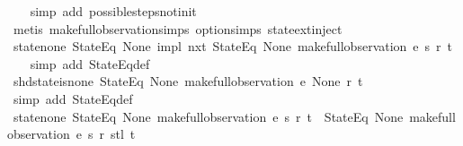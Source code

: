 \begin{isabellebody}
\ \ \isamarkupfalse%
\ {\isacharparenleft}simp\ add{\isacharcolon}\ possible{\isacharunderscore}steps{\isacharunderscore}not{\isacharunderscore}init{\isacharparenright}\isanewline
\ \ \isamarkupfalse%
\ {\isacharparenleft}metis\ make{\isacharunderscore}full{\isacharunderscore}observation{\isachardot}simps{\isacharparenleft}{}{\isacharparenright}\ option{\isachardot}simps{\isacharparenleft}{}{\isacharparenright}\ state{\isachardot}ext{\isacharunderscore}inject{\isacharparenright}%
\endisatagproof
{\isafoldproof}%
%
\isadelimproof
\isanewline
%
\endisadelimproof
\isanewline
{}\isamarkupfalse%
\ state{\isacharunderscore}none{\isacharcolon}\ {\isachardoublequoteopen}{\isacharparenleft}{\isacharparenleft}StateEq\ None{\isacharparenright}\ impl\ nxt\ {\isacharparenleft}StateEq\ None{\isacharparenright}{\isacharparenright}\ {\isacharparenleft}make{\isacharunderscore}full{\isacharunderscore}observation\ e\ s\ r\ t{\isacharparenright}{\isachardoublequoteclose}\isanewline
%
\isadelimproof
\ \ %
\endisadelimproof
%
\isatagproof
{}\isamarkupfalse%
\ {\isacharparenleft}simp\ add{\isacharcolon}\ StateEq{\isacharunderscore}def{\isacharparenright}%
\endisatagproof
{\isafoldproof}%
%
\isadelimproof
\isanewline
%
\endisadelimproof
\isanewline
{}\isamarkupfalse%
\ shd{\isacharunderscore}state{\isacharunderscore}is{\isacharunderscore}none{\isacharcolon}\ {\isachardoublequoteopen}{\isacharparenleft}StateEq\ None{\isacharparenright}\ {\isacharparenleft}make{\isacharunderscore}full{\isacharunderscore}observation\ e\ None\ r\ t{\isacharparenright}{\isachardoublequoteclose}\isanewline
%
\isadelimproof
\ \ %
\endisadelimproof
%
\isatagproof
{}\isamarkupfalse%
\ {\isacharparenleft}simp\ add{\isacharcolon}\ StateEq{\isacharunderscore}def{\isacharparenright}%
\endisatagproof
{\isafoldproof}%
%
\isadelimproof
\isanewline
%
\endisadelimproof
\isanewline
{}\isamarkupfalse%
\ state{\isacharunderscore}none{\isacharunderscore}{}{\isacharcolon}\ {\isachardoublequoteopen}{\isacharparenleft}StateEq\ None{\isacharparenright}\ {\isacharparenleft}make{\isacharunderscore}full{\isacharunderscore}observation\ e\ s\ r\ t{\isacharparenright}\ {\isasymLongrightarrow}\ {\isacharparenleft}StateEq\ None{\isacharparenright}\ {\isacharparenleft}make{\isacharunderscore}full{\isacharunderscore}observation\ e\ s\ r\ {\isacharparenleft}stl\ t{\isacharparenright}{\isacharparenright}{\isachardoublequoteclose}\isanewline
%
\isadelimproof
\ \ %
\endisadelimproof
%
\isatagproof

\end{isabellebody}
